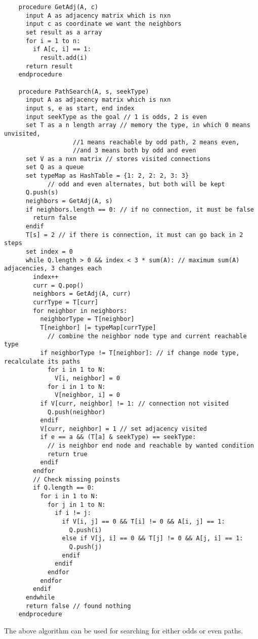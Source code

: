 \documentclass{article}
\begin{document}
\begin{enumerate}[topsep=0pt]
\begin{enumerate}
  \begin{verbatim}
    procedure GetAdj(A, c)
      input A as adjacency matrix which is nxn
      input c as coordinate we want the neighbors
      set result as a array
      for i = 1 to n:
        if A[c, i] == 1:
          result.add(i)
      return result
    endprocedure

    procedure PathSearch(A, s, seekType)
      input A as adjacency matrix which is nxn
      input s, e as start, end index
      input seekType as the goal // 1 is odds, 2 is even
      set T as a n length array // memory the type, in which 0 means unvisited, 
                   //1 means reachable by odd path, 2 means even,
                   //and 3 means both by odd and even
      set V as a nxn matrix // stores visited connections
      set Q as a queue
      set typeMap as HashTable = {1: 2, 2: 2, 3: 3} 
            // odd and even alternates, but both will be kept
      Q.push(s)
      neighbors = GetAdj(A, s)
      if neighbors.length == 0: // if no connection, it must be false
        return false
      endif
      T[s] = 2 // if there is connection, it must can go back in 2 steps
      set index = 0
      while Q.length > 0 && index < 3 * sum(A): // maximum sum(A) adjacencies, 3 changes each
        index++
        curr = Q.pop()
        neighbors = GetAdj(A, curr)
        currType = T[curr]
        for neighbor in neighbors:
          neighborType = T[neighbor]
          T[neighbor] |= typeMap[currType] 
            // combine the neighbor node type and current reachable type
          if neighborType != T[neighbor]: // if change node type, recalculate its paths
            for i in 1 to N:
              V[i, neighbor] = 0
            for i in 1 to N:
              V[neighbor, i] = 0
          if V[curr, neighbor] != 1: // connection not visited
            Q.push(neighbor)
          endif
          V[curr, neighbor] = 1 // set adjacency visited
          if e == a && (T[a] & seekType) == seekType: 
            // is neighbor end node and reachable by wanted condition
            return true
          endif
        endfor
        // Check missing poinsts
        if Q.length == 0:
          for i in 1 to N:
            for j in 1 to N:
              if i != j:
                if V[i, j] == 0 && T[i] != 0 && A[i, j] == 1:
                  Q.push(i)
                else if V[j, i] == 0 && T[j] != 0 && A[j, i] == 1:
                  Q.push(j)
                endif
              endif
            endfor
          endfor
        endif
      endwhile
      return false // found nothing
    endprocedure
  \end{verbatim}
  The above algorithm can be used for searching for either odds or even paths.


\end{enumerate}
\end{enumerate}
\end{document}
